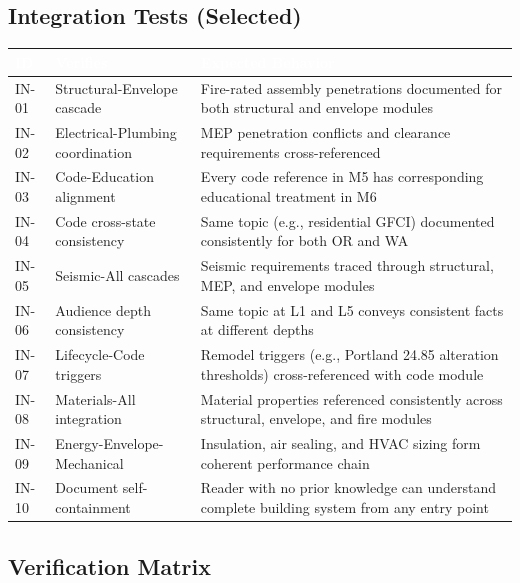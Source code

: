 \documentclass[11pt,letterpaper]{article}
\newcommand{\tableheader}[1]{\textbf{\sffamily\textcolor{white}{#1}}}
\begin{document}
\subsection{Integration Tests (Selected)}

\begin{center}
\begin{tabularx}{\textwidth}{C{1.2cm}L{3.5cm}X}
\toprule
{}
\tableheader{ID} & \tableheader{Verifies} & \tableheader{Expected Behavior} \\
\midrule
IN-01 & Structural-Envelope cascade & Fire-rated assembly penetrations documented for both structural and envelope modules \\
IN-02 & Electrical-Plumbing coordination & MEP penetration conflicts and clearance requirements cross-referenced \\
IN-03 & Code-Education alignment & Every code reference in M5 has corresponding educational treatment in M6 \\
IN-04 & Code cross-state consistency & Same topic (e.g., residential GFCI) documented consistently for both OR and WA \\
IN-05 & Seismic-All cascades & Seismic requirements traced through structural, MEP, and envelope modules \\
IN-06 & Audience depth consistency & Same topic at L1 and L5 conveys consistent facts at different depths \\
IN-07 & Lifecycle-Code triggers & Remodel triggers (e.g., Portland 24.85 alteration thresholds) cross-referenced with code module \\
IN-08 & Materials-All integration & Material properties referenced consistently across structural, envelope, and fire modules \\
IN-09 & Energy-Envelope-Mechanical & Insulation, air sealing, and HVAC sizing form coherent performance chain \\
IN-10 & Document self-containment & Reader with no prior knowledge can understand complete building system from any entry point \\
\bottomrule
\end{tabularx}
\end{center}

\subsection{Verification Matrix}
\end{document}
